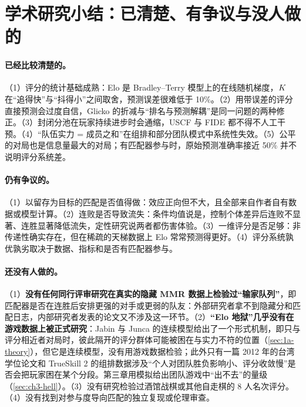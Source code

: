 \section{学术研究小结：已清楚、有争议与没人做的}\label{sec:1a-summary}

\paragraph{已经比较清楚的。}（1）评分的统计基础成熟：Elo 是 Bradley–Terry 模型上的在线随机梯度，$K$ 在“追得快”与“抖得小”之间取舍，预测误差很难低于 10\%。（2）用带误差的评分直接预测会过度自信，Glicko 的折减与“排名与预测解耦”是同一问题的两种修正。（3）封闭分池在玩家持续进步时会通缩，USCF 与 FIDE 都不得不人工干预。（4）“队伍实力 = 成员之和”在组排和部分团队模式中系统性失效。（5）公平的对局也是信息量最大的对局；有匹配器参与时，原始预测准确率接近 50\% 并不说明评分系统差。

\paragraph{仍有争议的。}（1）以留存为目标的匹配是否值得做：效应正向但不大，且全部来自作者自有数据或模型计算。（2）连败是否导致流失：条件均值说是，控制个体差异后连败不显著、连胜显著降低流失，定性研究说两者都伤害体验。（3）一维评分是否足够：非传递性确实存在，但在稀疏的天梯数据上 Elo 常常预测得更好。（4）评分系统孰优孰劣取决于数据、指标和是否有匹配器参与。

\paragraph{还没有人做的。}（1）\textbf{没有任何同行评审研究在真实的隐藏 MMR 数据上检验过“输家队列”}\nobreak，即匹配器是否在连胜后安排更强的对手或更弱的队友：外部研究者拿不到隐藏分和匹配日志，内部研究者发表的论文又不涉及这一环节。（2）\textbf{“Elo 地狱”几乎没有在游戏数据上被正式研究}：Jabin 与 Junca 的连续模型给出了一个形式机制，即只与评分相近者对局时，彼此隔开的评分群体可能被困在与实力不符的位置（\cref{sec:1a-theory}），但它是连续模型，没有用游戏数据检验；此外只有一篇 2012 年的台湾学位论文和 TrueSkill 2 的组排数据涉及“个人对团队胜负影响小、评分收敛慢”是否会把玩家困在某个分段。第三章用模拟给出团队游戏中“出不去”的量级（\cref{sec:ch3-hell}）。（3）没有研究检验过酒馆战棋或其他自走棋的 8 人名次评分。（4）没有找到对参与度导向匹配的独立复现或伦理审查。

